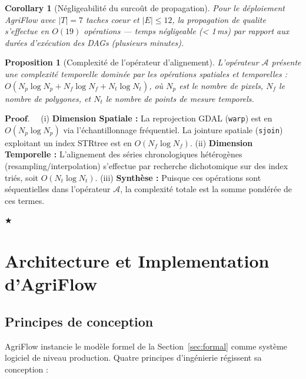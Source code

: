 \documentclass[12pt]{article}
\newtheorem{proposition}{Proposition}[section]
\newtheorem{corollary}[theorem]{Corollary}
\newenvironment{proof}{$\mathbf{Proof.\quad}$}{\begin{flushright}$\bigstar$\end{flushright}}
\begin{document}
\begin{corollary}[Négligeabilité du surcoût de propagation]
	Pour le déploiement AgriFlow avec $|T|=7$ taches coeur et $|E|\leq 12$,
	la propagation de qualite s'effectue en $O(19)$ opérations --- temps
	négligeable (< 1\,ms) par rapport aux durées d’exécution des DAGs
	(plusieurs minutes).
\end{corollary}
\begin{proposition}[Complexité de l'opérateur d'alignement]
	\label{prop:sta_complexity}
	L'opérateur $\mathcal{A}$ présente une complexité temporelle dominée par les opérations spatiales et temporelles :
	$O(N_p \log N_p + N_f \log N_f + N_t \log N_t)$, où $N_p$ est le nombre de pixels, $N_f$ le nombre de polygones, et $N_t$ le nombre de points de mesure temporels.
\end{proposition}

\begin{proof}
	(i) \textbf{Dimension Spatiale :} La reprojection GDAL (\texttt{warp}) est en $O(N_p \log N_p)$ via l'échantillonnage fréquentiel. La jointure spatiale (\texttt{sjoin}) exploitant un index STRtree est en $O(N_f \log N_f)$. 
	(ii) \textbf{Dimension Temporelle :} L'alignement des séries chronologiques hétérogènes (resampling/interpolation) s'effectue par recherche dichotomique sur des index triés, soit $O(N_t \log N_t)$. 
	(iii) \textbf{Synthèse :} Puisque ces opérations sont séquentielles dans l'opérateur $\mathcal{A}$, la complexité totale est la somme pondérée de ces termes. 
\end{proof}
	\section{Architecture et Implementation d'AgriFlow}
\label{sec:architecture}

\subsection{Principes de conception}

AgriFlow instancie le modèle formel de la Section~\ref{sec:formal}
comme système logiciel de niveau production. Quatre principes d’ingénierie régissent sa conception :
\end{document}

